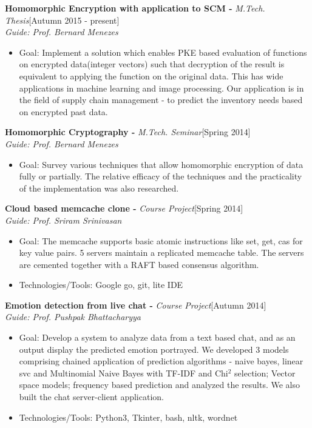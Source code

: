 \documentclass[a4paper,10pt]{article}
\newcommand{\header}[1]{
\begin{center}
\fbox{\begin{minipage}{\textwidth}
\raggedright \large \bf #1
\end{minipage}}
\end{center}
\vspace{-0.3cm}
}
\begin{document}
\vspace{-0.4cm}
\header{Post Graduate Research/Projects}
\vspace{0.2cm}
\begingroup
\linespread{0.5}
\textbf{Homomorphic Encryption with application to SCM -} \emph{M.Tech. Thesis}\hfill[Autumn 2015 - present] \\
\emph{Guide: Prof. Bernard Menezes}
\begin{itemize}
 \item Goal: Implement a solution which enables PKE based evaluation of functions on encrypted data(integer vectors) such that decryption of the result is equivalent to applying the function on the original data. This has wide applications in machine learning and image processing. Our application is in the field of supply chain management - to predict the inventory needs based on encrypted past data.
\end{itemize}

\noindent
\textbf{Homomorphic Cryptography -} \emph{M.Tech. Seminar}\hfill[Spring 2014] \\
\emph{Guide: Prof. Bernard Menezes}
\begin{itemize}
 \item Goal: Survey various techniques that allow homomorphic encryption of data fully or partially. The relative efficacy of the techniques and the practicality of the implementation was also researched.
\end{itemize}

\noindent
\textbf{Cloud based memcache clone -} \emph{Course Project}\hfill[Spring 2014] \\
\emph{Guide: Prof. Sriram Srinivasan}
\begin{itemize}
 \item Goal: The memcache supports basic atomic instructions like set, get, cas for key value pairs. 5 servers maintain a replicated memcache table. The servers are cemented together with a RAFT based consensus algorithm.
 \item Technologies/Tools: Google go, git, lite IDE
\end{itemize}

\noindent
\textbf{Emotion detection from live chat -} \emph{Course Project}\hfill[Autumn 2014] \\
\emph{Guide: Prof. Pushpak Bhattacharyya}
\begin{itemize}
 \item Goal: Develop a system to analyze data from a text based chat, and as an output display the predicted emotion portrayed. We developed 3 models comprising chained application of prediction algorithms - naive bayes, linear svc and Multinomial Naive Bayes with TF-IDF and Chi$^2$ selection; Vector space models; frequency based prediction and analyzed the results. We also built the chat server-client application.
 \item Technologies/Tools: Python3, Tkinter, bash, nltk, wordnet
\end{itemize}
\end{document}
